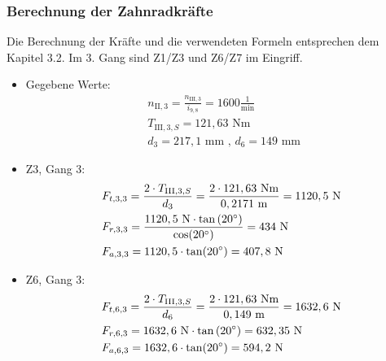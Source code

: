\subsubsection{Berechnung der Zahnradkräfte}
Die Berechnung der Kräfte und die verwendeten Formeln entsprechen dem Kapitel 3.2. Im 3. Gang sind Z1/Z3 und Z6/Z7 im Eingriff.
\begin{itemize}
	\item Gegebene Werte: 
	\begin{align*}
	&n_{\mathrm{II},3} = \frac{n_{\mathrm{III},3}}{i_{9,8}} = 1600\frac{1}{\text{min}} \\
	&T_{\mathrm{III},3,S} = 121,63\text{ Nm} \\	
	&d_3 = 217,1\text{ mm} \text{ , } d_6 = 149 \text{ mm } 
	\end{align*}
	\item Z3, Gang 3:
	\begin{align*} 
	&F_{t,3,3} = \frac{2\cdot T_{\mathrm{III},3,S}}{d_3} = \frac{2 \cdot 121,63 \text{ Nm}}{0,2171 \text{ m}} = 1120,5 \text{ N}\\ 
	&F_{r,3,3} = \frac{1120,5 \text{ N} \cdot \tan{(20^\circ)}}{\cos(20^\circ)} =434\text{ N}\\ 
	&F_{a,3,3} =1120,5 \cdot \tan(20^\circ) =407,8 \text{ N}
	\end{align*}
	\item Z6, Gang 3:
	\begin{align*}
	&F_{t,6,3} = \frac{2\cdot T_{\mathrm{III},3,S}}{d_6} = \frac{2 \cdot 121,63 \text{ Nm}}{0,149 \text{ m}} = 1632,6\text{ N}\\ 
	&F_{r,6,3} = 1632,6 \text{ N} \cdot \tan{(20^\circ)} = 632,35\text{ N}\\ 
	&F_{a,6,3} =1632,6\cdot \tan(20^\circ) =594,2 \text{ N}
	\end{align*}
\end{itemize}
